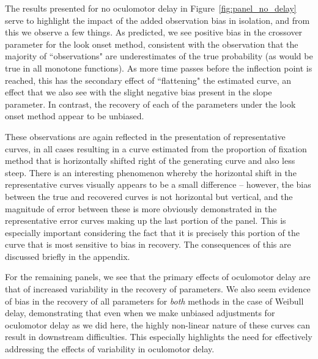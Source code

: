 \documentclass{article}
\begin{document}
The results presented for no oculomotor delay in Figure~\ref{fig:panel_no_delay} serve to highlight the impact of the added observation bias in isolation, and from this we observe a few things. As predicted, we see positive bias in the crossover parameter for the look onset method, consistent with the observation that the majority of ``observations" are underestimates of the true probability (as would be true in all monotone functions). As more time passes before the inflection point is reached, this has the secondary effect of ``flattening" the estimated curve, an effect that we also see with the slight negative bias present in the slope parameter. In contrast, the recovery of each of the parameters under the look onset method appear to be unbiased.

These observations are again reflected in the presentation of representative curves, in all cases resulting in a curve estimated from the proportion of fixation method that is horizontally shifted right of the generating curve and also less steep. There is an interesting phenomenon whereby the horizontal shift in the representative curves visually appears to be a small difference -- however, the bias between the true and recovered curves is not horizontal but vertical, and the magnitude of error between these is more obviously demonstrated in the representative error curves making up the last portion of the panel. This is especially important considering the fact that it is precisely this portion of the curve that is most sensitive to bias in recovery. The consequences of this are discussed briefly in the appendix. 

For the remaining panels, we see that the primary effects of oculomotor delay are that of increased variability in the recovery of parameters. We also seem evidence of bias in the recovery of all parameters for \textit{both} methods in the case of Weibull delay, demonstrating that even when we make unbiased adjustments for oculomotor delay as we did here, the highly non-linear nature of these curves can result in downstream difficulties. This especially highlights the need for effectively addressing the effects of variability in oculomotor delay.
\end{document}
